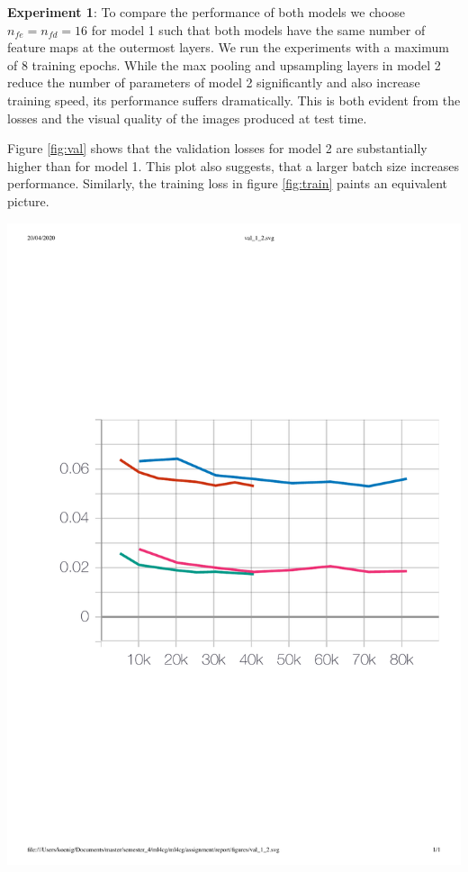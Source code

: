 \documentclass{article}
\newenvironment{Figure}
  {\par\medskip\noindent\minipage{\linewidth}}
  {\endminipage\par\medskip}
\begin{document}
\begin{multicols}{2}
\textbf{Experiment 1}: To compare the performance of both models we choose $n_{fe}=n_{fd}=16$ for model 1 such that both models have the same number of feature maps at the outermost layers. We run the experiments with a maximum of 8 training epochs. While the max pooling and upsampling layers in model 2 reduce the number of parameters of model 2 significantly and also increase training speed, its performance suffers dramatically. This is both evident from the losses and the visual quality of the images produced at test time. 

Figure \ref{fig:val} shows that the validation losses for model 2 are substantially higher than for model 1. This plot also suggests, that a larger batch size increases performance. Similarly, the training loss in figure \ref{fig:train} paints an equivalent picture. 

\begin{Figure}
	\centering 
	\includegraphics[width=\linewidth]{figures/val_1_2.pdf}
	\label{fig:val}
\end{Figure}


\end{multicols}
\end{document}
